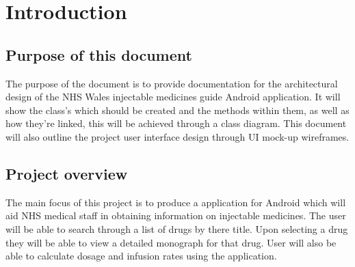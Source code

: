 \documentclass[11pt,fleqn,twoside]{article}
\begin{document}
\wordcount{}

\mmp

\setcounter{tocdepth}{3} %


\section{Introduction}
\subsection{Purpose of this document}
The purpose of the document is to provide documentation for the architectural design of the NHS Wales injectable medicines guide Android application.  It will show the class's which should be created and the methods within them, as well as how they're linked, this will be achieved through a class diagram. This document will also outline the project user interface design through UI mock-up wireframes.


\subsection{Project overview}
The main focus of this project is to produce a application for Android which will aid NHS medical staff in obtaining information on injectable medicines. The user will be able to search through a list of drugs by there title. Upon selecting a drug they will be able to view a detailed monograph for that drug. User will also be able to calculate dosage and infusion rates using the application.
\newpage
\end{document}
